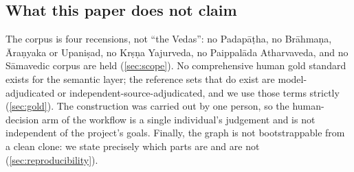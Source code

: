 \subsection{What this paper does not claim}

The corpus is four recensions, not ``the Vedas'': no Padap\=a\d{t}ha, no
Br\=ahma\d{n}a, \=Ara\d{n}yaka or Upani\d{s}ad, no Kr\d{s}\d{n}a Yajurveda, no
Paippal\=ada Atharvaveda, and no S\=amavedic  corpus are held
(\cref{sec:scope}). No comprehensive human gold standard exists for the semantic
layer; the reference sets that do exist are model-adjudicated or
independent-source-adjudicated, and we use those terms strictly
(\cref{sec:gold}). The construction was carried out by one person, so the
human-decision arm of the workflow is a single individual's judgement and is not
independent of the project's goals. Finally, the graph is not bootstrappable from a
clean clone: we state precisely which parts are and are not
(\cref{sec:reproducibility}).
